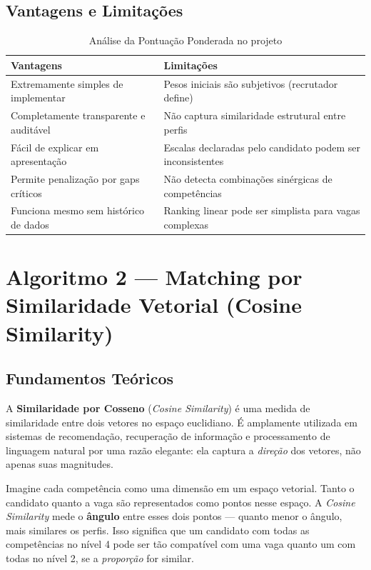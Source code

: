 \documentclass[12pt,a4paper]{article}
\begin{document}
\subsection{Vantagens e Limitações}

\begin{table}[H]
\centering
\caption{Análise da Pontuação Ponderada no projeto}
\begin{tabular}{|p{7cm}|| p{7cm}|}
  \toprule
  \textbf{Vantagens} & \textbf{Limitações} \\
  \hline
  Extremamente simples de implementar & Pesos iniciais são subjetivos (recrutador define) \\
  \hline
  Completamente transparente e auditável & Não captura similaridade estrutural entre perfis \\
  \hline
  Fácil de explicar em apresentação & Escalas declaradas pelo candidato podem ser inconsistentes \\
  \hline
  Permite penalização por gaps críticos & Não detecta combinações sinérgicas de competências \\
  \hline
  Funciona mesmo sem histórico de dados & Ranking linear pode ser simplista para vagas complexas \\
  \bottomrule
\end{tabular}
\end{table}

\newpage

\section{Algoritmo 2 — Matching por Similaridade Vetorial (Cosine Similarity)}

\subsection{Fundamentos Teóricos}

A \textbf{Similaridade por Cosseno} (\textit{Cosine Similarity}) é uma medida de similaridade
entre dois vetores no espaço euclidiano. É amplamente utilizada em sistemas de
recomendação, recuperação de informação e processamento de linguagem natural por
uma razão elegante: ela captura a \emph{direção} dos vetores, não apenas suas magnitudes.

\begin{infobox}
Imagine cada competência como uma dimensão em um espaço vetorial. Tanto o candidato
quanto a vaga são representados como pontos nesse espaço. A \textit{Cosine Similarity} mede o
\textbf{ângulo} entre esses dois pontos — quanto menor o ângulo, mais similares os perfis.
Isso significa que um candidato com todas as competências no nível 4 pode ser tão
compatível com uma vaga quanto um com todas no nível 2, se a \emph{proporção} for similar.
\end{infobox}
\end{document}
